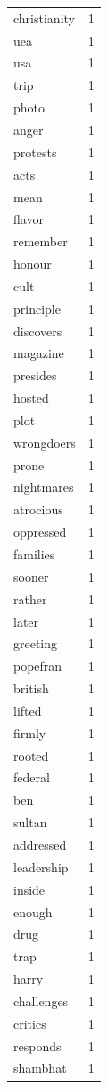 \begin{tabular}{lr}
christianity & 1 \\
uea & 1 \\
usa & 1 \\
trip & 1 \\
photo & 1 \\
anger & 1 \\
protests & 1 \\
acts & 1 \\
mean & 1 \\
flavor & 1 \\
remember & 1 \\
honour & 1 \\
cult & 1 \\
principle & 1 \\
discovers & 1 \\
magazine & 1 \\
presides & 1 \\
hosted & 1 \\
plot & 1 \\
wrongdoers & 1 \\
prone & 1 \\
nightmares & 1 \\
atrocious & 1 \\
oppressed & 1 \\
families & 1 \\
sooner & 1 \\
rather & 1 \\
later & 1 \\
greeting & 1 \\
popefran & 1 \\
british & 1 \\
lifted & 1 \\
firmly & 1 \\
rooted & 1 \\
federal & 1 \\
ben & 1 \\
sultan & 1 \\
addressed & 1 \\
leadership & 1 \\
inside & 1 \\
enough & 1 \\
drug & 1 \\
trap & 1 \\
harry & 1 \\
challenges & 1 \\
critics & 1 \\
responds & 1 \\
shambhat & 1 \\

\end{tabular}
